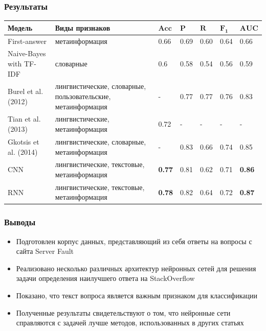 \documentclass[10pt]{beamer}
\begin{document}

\begin{frame}
\frametitle{Результаты}

\begin{center}
	\small
    \begin{tabularx}{\textwidth}{| l | X | l | l | l | l | l |}
        \hline
	    \textbf{Модель} & \textbf{Виды признаков} & $\mathbf{Acc}$ & $\mathbf{P}$ & $\mathbf{R}$ & $\mathbf{F_1}$ & $\mathbf{AUC}$ \\ \hline
        \hline
	    First-answer & метаинформация & 0.66 & 0.69 & 0.60 & 0.64 & 0.66 \\ \hline
    	Naive-Bayes with TF-IDF & словарные & 0.6 & 0.58 & 0.54 & 0.56 & 0.59 \\ \hline
        \hline
	    Burel et al. (2012) & лингвистические, словарные, пользовательские, метаинформация & - & 0.77 & 0.77 & 0.76 & 0.83 \\ \hline
    	Tian et al. (2013) & лингвистические, метаинформация & 0.72 & - & - & - & - \\ \hline
        Gkotsis et al. (2014) & лингвистические, словарные, метаинформация & - & 0.83 & 0.66 & 0.74 & 0.85 \\ \hline
	    \hline
        CNN & лингвистические, текстовые, метаинформация & \textbf{0.77} & 0.81 & 0.62 & 0.71 & \textbf{0.86} \\ \hline
	    RNN & лингвистические, текстовые, метаинформация & \textbf{0.78} & 0.82 & 0.64 & 0.72 & \textbf{0.87} \\ \hline
    \end{tabularx}
\end{center}
\end{frame}


\begin{frame}
\frametitle{Выводы}

\begin{itemize}
	\item Подготовлен корпус данных, представляющий из себя ответы на вопросы с сайта Server Fault
	\item Реализовано несколько различных архитектур нейронных сетей для решения задачи определения наилучшего ответа на StackOverflow
	\item Показано, что текст вопроса является важным признаком для классификации
	\item Полученные результаты свидетельствуют о том, что нейронные сети справляются с задачей лучше методов, использованных в других статьях
\end{itemize}

\end{frame}


\end{document}
